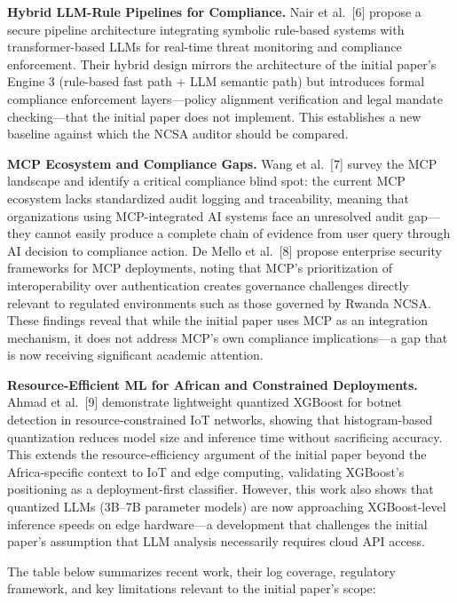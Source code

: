 \documentclass[12pt]{article}
\begin{document}
\textbf{Hybrid LLM-Rule Pipelines for Compliance.} Nair et al.~[6] propose a secure pipeline architecture integrating symbolic rule-based systems with transformer-based LLMs for real-time threat monitoring and compliance enforcement. Their hybrid design mirrors the architecture of the initial paper's Engine 3 (rule-based fast path + LLM semantic path) but introduces formal compliance enforcement layers---policy alignment verification and legal mandate checking---that the initial paper does not implement. This establishes a new baseline against which the NCSA auditor should be compared.

\textbf{MCP Ecosystem and Compliance Gaps.} Wang et al.~[7] survey the MCP landscape and identify a critical compliance blind spot: the current MCP ecosystem lacks standardized audit logging and traceability, meaning that organizations using MCP-integrated AI systems face an unresolved audit gap---they cannot easily produce a complete chain of evidence from user query through AI decision to compliance action. De Mello et al.~[8] propose enterprise security frameworks for MCP deployments, noting that MCP's prioritization of interoperability over authentication creates governance challenges directly relevant to regulated environments such as those governed by Rwanda NCSA. These findings reveal that while the initial paper uses MCP as an integration mechanism, it does not address MCP's own compliance implications---a gap that is now receiving significant academic attention.

\textbf{Resource-Efficient ML for African and Constrained Deployments.} Ahmad et al.~[9] demonstrate lightweight quantized XGBoost for botnet detection in resource-constrained IoT networks, showing that histogram-based quantization reduces model size and inference time without sacrificing accuracy. This extends the resource-efficiency argument of the initial paper beyond the Africa-specific context to IoT and edge computing, validating XGBoost's positioning as a deployment-first classifier. However, this work also shows that quantized LLMs (3B--7B parameter models) are now approaching XGBoost-level inference speeds on edge hardware---a development that challenges the initial paper's assumption that LLM analysis necessarily requires cloud API access.

\bigskip

The table below summarizes recent work, their log coverage, regulatory framework, and key limitations relevant to the initial paper's scope:
\end{document}
